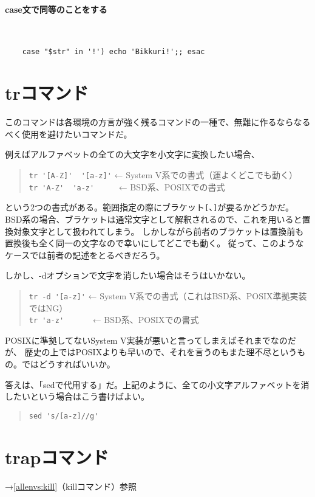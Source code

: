 \paragraph{case文で同等のことをする} 　\\
\begin{frameboxit}{160.0mm}
\begin{verbatim}
	case "$str" in '!') echo 'Bikkuri!';; esac
\end{verbatim}
\end{frameboxit}

\section{trコマンド}
\label{allenvs:tr}

このコマンドは各環境の方言が強く残るコマンドの一種で、無難に作るならなるべく使用を避けたいコマンドだ。

例えばアルファベットの全ての大文字を小文字に変換したい場合、
\begin{quote}
	\verb|tr '[A-Z]'  '[a-z]'| ← System V系での書式（運よくどこでも動く）\\
	\verb|tr 'A-Z'  'a-z'     | ← BSD系、POSIXでの書式
\end{quote}
という2つの書式がある。範囲指定の際にブラケット\verb|[|、\verb|]|が要るかどうかだ。
BSD系の場合、ブラケットは通常文字として解釈されるので、これを用いると置換対象文字として扱われてしまう。
しかしながら前者のブラケットは置換前も置換後も全く同一の文字なので幸いにしてどこでも動く。
従って、このようなケースでは前者の記述をとるべきだろう。

しかし、-dオプションで文字を消したい場合はそうはいかない。
\begin{quote}
	\verb|tr -d '[a-z]'| ← System V系での書式（これはBSD系、POSIX準拠実装ではNG）\\
	\verb|tr 'a-z'      | ← BSD系、POSIXでの書式
\end{quote}

POSIXに準拠してないSystem V実装が悪いと言ってしまえばそれまでなのだが、
歴史の上ではPOSIXよりも早いので、それを言うのもまた理不尽というもの。ではどうすればいいか。

答えは、「sedで代用する」だ。上記のように、全ての小文字アルファベットを消したいという場合はこう書けばよい。
\begin{quote}
	\verb|sed 's/[a-z]//g'|
\end{quote}


\section{trapコマンド}

\noindent
→\ref{allenvs:kill}（killコマンド）参照
